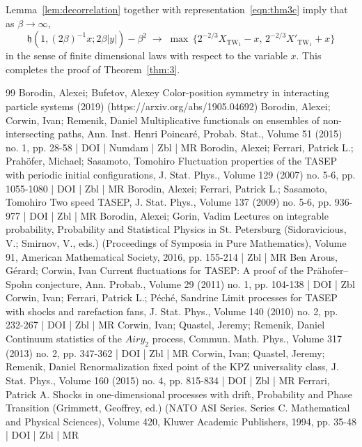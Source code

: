 \documentclass[10pt]{amsart}
\theoremstyle{definition}\newtheorem{defi}[theo]{Definition}\newtheorem{rema}[theo]{Remark}\newtheorem{exam}[theo]{Example}\newtheorem{exem}[theo]{Example}\newtheorem{nota}[theo]{Notation}
\DeclareMathOperator{\tw}{TW}
\newcommand{\h}{\mathfrak{h}}
\begin{document}
Lemma~\ref{lem:decorrelation} together with representation~\eqref{eqn:thm3c} imply that as $\beta \to \infty$,
\[
\h(1,(2\beta)^{-1}x; 2\beta|y|) - \beta^2 \; \longrightarrow \; \max \, \{ 2^{-2/3}X_{\tw_1} - x, \, 2^{-2/3} X'_{\tw_1}+x\}
\]
in the sense of finite dimensional laws with respect to the variable $x$. This completes the proof of Theorem~\ref{thm:3}.



\begin{thebibliography}{99}
Borodin, Alexei; Bufetov, Alexey Color-position symmetry in interacting particle systems (2019) (https://arxiv.org/abs/1905.04692)
Borodin, Alexei; Corwin, Ivan; Remenik, Daniel Multiplicative functionals on ensembles of non-intersecting paths, Ann. Inst. Henri Poincaré, Probab. Stat., Volume 51 (2015) no. 1, pp. 28-58 | DOI | Numdam | Zbl | MR
Borodin, Alexei; Ferrari, Patrick L.; Prahöfer, Michael; Sasamoto, Tomohiro Fluctuation properties of the TASEP with periodic initial configurations, J. Stat. Phys., Volume 129 (2007) no. 5-6, pp. 1055-1080 | DOI | Zbl | MR
Borodin, Alexei; Ferrari, Patrick L.; Sasamoto, Tomohiro Two speed TASEP, J. Stat. Phys., Volume 137 (2009) no. 5-6, pp. 936-977 | DOI | Zbl | MR
Borodin, Alexei; Gorin, Vadim Lectures on integrable probability, Probability and Statistical Physics in St. Petersburg (Sidoravicious, V.; Smirnov, V., eds.) (Proceedings of Symposia in Pure Mathematics), Volume 91, American Mathematical Society, 2016, pp. 155-214 | Zbl | MR
Ben Arous, Gérard; Corwin, Ivan Current fluctuations for TASEP: A proof of the Prähofer–Spohn conjecture, Ann. Probab., Volume 29 (2011) no. 1, pp. 104-138 | DOI | Zbl
Corwin, Ivan; Ferrari, Patrick L.; Péché, Sandrine Limit processes for TASEP with shocks and rarefaction fans, J. Stat. Phys., Volume 140 (2010) no. 2, pp. 232-267 | DOI | Zbl | MR
Corwin, Ivan; Quastel, Jeremy; Remenik, Daniel Continuum statistics of the ${Airy}_2$ process, Commun. Math. Phys., Volume 317 (2013) no. 2, pp. 347-362 | DOI | Zbl | MR
Corwin, Ivan; Quastel, Jeremy; Remenik, Daniel Renormalization fixed point of the KPZ universality class, J. Stat. Phys., Volume 160 (2015) no. 4, pp. 815-834 | DOI | Zbl | MR
Ferrari, Patrick A. Shocks in one-dimensional processes with drift, Probability and Phase Transition (Grimmett, Geoffrey, ed.) (NATO ASI Series. Series C. Mathematical and Physical Sciences), Volume 420, Kluwer Academic Publishers, 1994, pp. 35-48 | DOI | Zbl | MR

\end{thebibliography}
\end{document}
